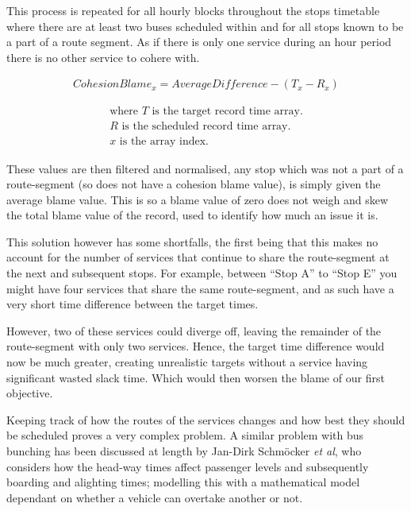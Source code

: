 \documentclass{article}
\begin{document}
\par 
This process is repeated for all hourly blocks throughout the stops timetable where there are at least two buses scheduled within and for all stops known to be a part of a route segment. As if there is only one service during an hour period there is no other service to cohere with.  
 
 
\begin{gather}
	\label{cohesionBlame}
	CohesionBlame_x = AverageDifference - (T_x  - R_x) 
\end{gather}

\begin{align*}
	\text{where~$T$ is the target record time array.} \\
	\text{$R$ is the scheduled record time array.} \\
	\text{$x$ is the array index.} 
\end{align*}


\par 
These values are then filtered and normalised, any stop which was not a part of a route-segment (so does not have a cohesion blame value),  is simply given the average blame value. This is so a blame value of zero does not weigh and skew the total blame value of the record, used to identify how much an issue it is.


This solution however has some shortfalls, the first being that this makes no account for the number of services that continue to share the route-segment at the next and subsequent stops. For example, between ``Stop A'' to ``Stop E'' you might have four services that share the same route-segment, and as such have a very short time difference between the target times. 

\par 
However, two of these services could diverge off, leaving the remainder of the route-segment with only two services. Hence, the target time difference would now be much greater, creating unrealistic targets without a service having significant wasted slack time. Which would then worsen the blame of our first objective. 


\par 
Keeping track of how the routes of the services changes and how best they should be scheduled proves a very complex problem. A similar problem with bus bunching has been discussed at length by Jan-Dirk Schmöcker \textsl{et al}, who considers how the head-way times affect passenger levels and subsequently boarding and alighting times; modelling this with a mathematical model dependant on whether a vehicle can overtake another or not\cite{RN40}.
\end{document}

